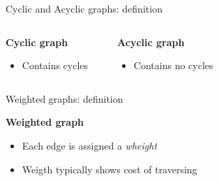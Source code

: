 \documentclass[compress]{beamer}
\begin{document}
\begin{frame}{Cyclic and Acyclic graphs: definition}
  \begin{columns}
    \begin{block}{\textbf{Cyclic graph}}
      \begin{itemize}
        \item Contains cycles
      \end{itemize}
    \end{block}
    \begin{center}
    
  \end{center}
    \begin{block}{\textbf{Acyclic graph}}
      \begin{itemize}
        \item Contains no cycles
      \end{itemize}
    \end{block}
    \begin{center}
    
    \end{center}
  \end{columns}
\end{frame}

\begin{frame}{Weighted graphs: definition}
  \begin{block}{\textbf{Weighted graph}}
    \begin{itemize}
      \item Each edge is assigned a \emph{wheight}
      \item Weigth typically shows cost of traversing
    \end{itemize}
  \end{block}
  \begin{center}
  
  \end{center}
\end{frame}
\end{document}
